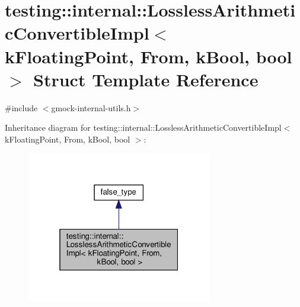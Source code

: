 \hypertarget{structtesting_1_1internal_1_1_lossless_arithmetic_convertible_impl_3_01k_floating_point_00_01_from_00_01k_bool_00_01bool_01_4}{}\section{testing\+:\+:internal\+:\+:Lossless\+Arithmetic\+Convertible\+Impl$<$ k\+Floating\+Point, From, k\+Bool, bool $>$ Struct Template Reference}
\label{structtesting_1_1internal_1_1_lossless_arithmetic_convertible_impl_3_01k_floating_point_00_01_from_00_01k_bool_00_01bool_01_4}


{\ttfamily \#include $<$gmock-\/internal-\/utils.\+h$>$}



Inheritance diagram for testing\+:\+:internal\+:\+:Lossless\+Arithmetic\+Convertible\+Impl$<$ k\+Floating\+Point, From, k\+Bool, bool $>$\+:
\nopagebreak
\begin{figure}[H]
\begin{center}
\leavevmode
\includegraphics[width=229pt]{structtesting_1_1internal_1_1_lossless_arithmetic_convertible_impl_3_01k_floating_point_00_01_frabc93aec973695c0baf479d10c040990}
\end{center}
\end{figure}


